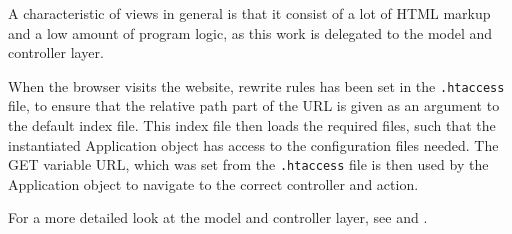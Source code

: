 \begin{description}[style=nextline]
	A characteristic of views in general is that it consist of a lot of HTML markup and a low amount of program logic, as this work is delegated to the model and controller layer. 
	
	\item[Application]
	When the browser visits the website, rewrite rules has been set in the \texttt{.htaccess} file, to ensure that the relative path part of the URL is given as an argument to the default index file. This index file then loads the required files, such that the instantiated Application object has access to the configuration files needed.
	The GET variable URL, which was set from the \texttt{.htaccess} file is then used by the Application object to navigate to the correct controller and action.
	
	
\end{description}

For a more detailed look at the model and controller layer, see  and .